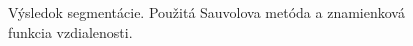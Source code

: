 \documentclass[a4paper,11pt,oneside]{article}%
\begin{document}
\begin{figure}[H]
    \hspace{5px}
    \hspace{5px}
    \caption{Výsledok segmentácie. Použitá Sauvolova metóda a znamienková funkcia vzdialenosti.}
    \label{fig:sauvola_sdf}
\end{figure}
\end{document}
